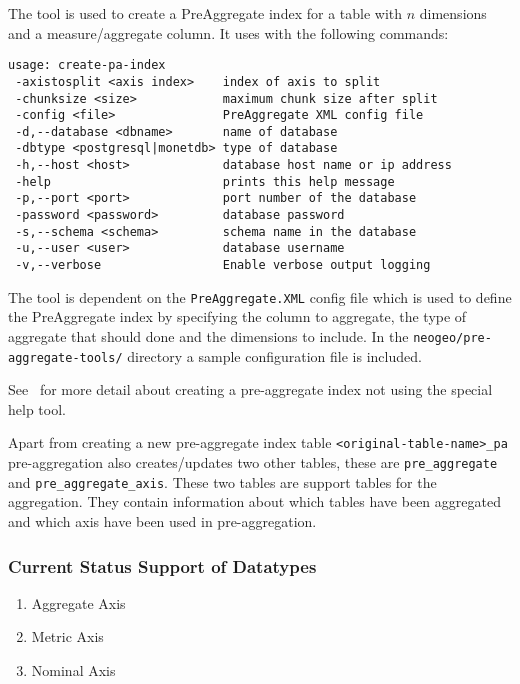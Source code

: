 The tool is used to create a PreAggregate index for a table with $\textit{n}$ dimensions and a measure/aggregate column. It uses with the following commands:
\begin{lstlisting}[basicstyle=\small]
usage: create-pa-index
 -axistosplit <axis index>    index of axis to split
 -chunksize <size>            maximum chunk size after split
 -config <file>               PreAggregate XML config file
 -d,--database <dbname>       name of database
 -dbtype <postgresql|monetdb> type of database
 -h,--host <host>             database host name or ip address
 -help                        prints this help message
 -p,--port <port>             port number of the database
 -password <password>         database password
 -s,--schema <schema>         schema name in the database
 -u,--user <user>             database username
 -v,--verbose                 Enable verbose output logging
\end{lstlisting}
The tool is dependent on the \lstinline|PreAggregate.XML| config file which is used to define the PreAggregate index by specifying the column to aggregate, the type of aggregate that should done and the dimensions to include. In the \lstinline|neogeo/pre-aggregate-tools/| directory a sample configuration file is included.


See~ for more detail about creating a pre-aggregate index not using the special help tool.

Apart from creating a new pre-aggregate index table \lstinline|<original-table-name>_pa| pre-aggregation also creates/updates two other tables, these are \lstinline|pre_aggregate| and \lstinline|pre_aggregate_axis|. These two tables are support tables for the aggregation. They contain information about which tables have been aggregated and which axis have been used in pre-aggregation.
\subsubsection{Current Status Support of Datatypes}
\begin{enumerate}
	\item Aggregate Axis
	\item Metric Axis
	\item Nominal Axis
\end{enumerate}

